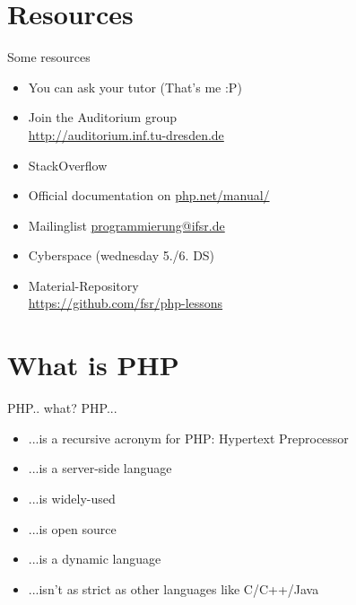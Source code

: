 \section{Resources}
\begin{frame}{Some resources}
	\begin{itemize}
		\item You can ask your tutor (That's me :P)
		\item Join the Auditorium group \hfill \\
			\url{http://auditorium.inf.tu-dresden.de}
		\item StackOverflow \hfill \\
		\item Official documentation on \url{php.net/manual/} \pause
        \item Mailinglist \url{programmierung@ifsr.de}
        \item Cyberspace (wednesday 5./6. DS)
		\item Material-Repository \\
			\url{https://github.com/fsr/php-lessons}
	\end{itemize}
\end{frame}

\section{What is PHP}
\begin{frame}{PHP.. what?}
	PHP...
	\begin{itemize}
		\item ...is a recursive acronym for PHP: Hypertext Preprocessor \pause
		\item ...is a server-side language \pause
		\item ...is widely-used \pause
		\item ...is open source \pause
		\item ...is a dynamic language \pause
		\item ...isn't as strict as other languages like C/C++/Java
	\end{itemize}
\end{frame}

